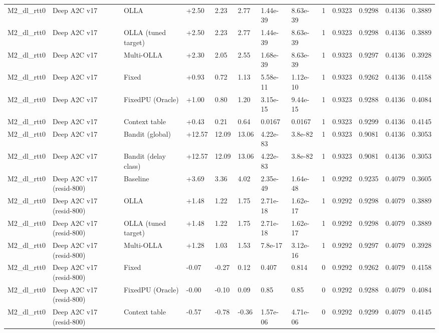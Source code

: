 \documentclass[10pt]{article}
\begin{document}
\begin{landscape}
\begin{longtable}{@{}lllllllllllll@{}}
M2\_dl\_rtt0 & Deep A2C v17 & OLLA & +2.50 & 2.23 & 2.77 & 1.44e-39 & 8.63e-39 & 1 & 0.9323 & 0.9298 & 0.4136 & 0.3889 \\
M2\_dl\_rtt0 & Deep A2C v17 & OLLA (tuned target) & +2.50 & 2.23 & 2.77 & 1.44e-39 & 8.63e-39 & 1 & 0.9323 & 0.9298 & 0.4136 & 0.3889 \\
M2\_dl\_rtt0 & Deep A2C v17 & Multi-OLLA & +2.30 & 2.05 & 2.55 & 1.68e-39 & 8.63e-39 & 1 & 0.9323 & 0.9297 & 0.4136 & 0.3928 \\
M2\_dl\_rtt0 & Deep A2C v17 & Fixed & +0.93 & 0.72 & 1.13 & 5.58e-11 & 1.12e-10 & 1 & 0.9323 & 0.9262 & 0.4136 & 0.4158 \\
M2\_dl\_rtt0 & Deep A2C v17 & FixedPU (Oracle) & +1.00 & 0.80 & 1.20 & 3.15e-15 & 9.44e-15 & 1 & 0.9323 & 0.9288 & 0.4136 & 0.4084 \\
M2\_dl\_rtt0 & Deep A2C v17 & Context table & +0.43 & 0.21 & 0.64 & 0.0167 & 0.0167 & 1 & 0.9323 & 0.9299 & 0.4136 & 0.4145 \\
M2\_dl\_rtt0 & Deep A2C v17 & Bandit (global) & +12.57 & 12.09 & 13.06 & 4.22e-83 & 3.8e-82 & 1 & 0.9323 & 0.9081 & 0.4136 & 0.3053 \\
M2\_dl\_rtt0 & Deep A2C v17 & Bandit (delay class) & +12.57 & 12.09 & 13.06 & 4.22e-83 & 3.8e-82 & 1 & 0.9323 & 0.9081 & 0.4136 & 0.3053 \\
M2\_dl\_rtt0 & Deep A2C v17 (resid-800) & Baseline & +3.69 & 3.36 & 4.02 & 2.35e-49 & 1.64e-48 & 1 & 0.9292 & 0.9235 & 0.4079 & 0.3605 \\
M2\_dl\_rtt0 & Deep A2C v17 (resid-800) & OLLA & +1.48 & 1.22 & 1.75 & 2.71e-18 & 1.62e-17 & 1 & 0.9292 & 0.9298 & 0.4079 & 0.3889 \\
M2\_dl\_rtt0 & Deep A2C v17 (resid-800) & OLLA (tuned target) & +1.48 & 1.22 & 1.75 & 2.71e-18 & 1.62e-17 & 1 & 0.9292 & 0.9298 & 0.4079 & 0.3889 \\
M2\_dl\_rtt0 & Deep A2C v17 (resid-800) & Multi-OLLA & +1.28 & 1.03 & 1.53 & 7.8e-17 & 3.12e-16 & 1 & 0.9292 & 0.9297 & 0.4079 & 0.3928 \\
M2\_dl\_rtt0 & Deep A2C v17 (resid-800) & Fixed & -0.07 & -0.27 & 0.12 & 0.407 & 0.814 & 0 & 0.9292 & 0.9262 & 0.4079 & 0.4158 \\
M2\_dl\_rtt0 & Deep A2C v17 (resid-800) & FixedPU (Oracle) & -0.00 & -0.10 & 0.09 & 0.85 & 0.85 & 0 & 0.9292 & 0.9288 & 0.4079 & 0.4084 \\
M2\_dl\_rtt0 & Deep A2C v17 (resid-800) & Context table & -0.57 & -0.78 & -0.36 & 1.57e-06 & 4.71e-06 & 0 & 0.9292 & 0.9299 & 0.4079 & 0.4145 \\

\end{longtable}
\end{landscape}
\end{document}
